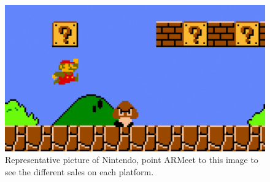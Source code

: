 
\begin{figure}[h]
  \centering
  \centerline{\includegraphics[scale=0.3]{images/NintendoMainTarget.png}}
  \caption{Representative picture of Nintendo, point ARMeet to this image to
    see the different sales on each platform.}
  \label{fig:NintendoImage}
\end{figure}



